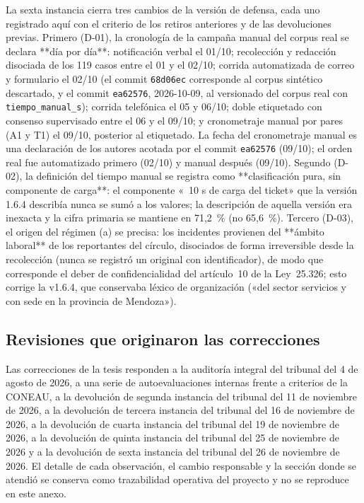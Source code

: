 La sexta instancia cierra tres cambios de la versión de defensa, cada uno registrado aquí con el criterio de los retiros anteriores y de las devoluciones previas. Primero (D-01), la cronología de la campaña manual del corpus real se declara **día por día**: notificación verbal el 01/10; recolección y redacción disociada de los 119 casos entre el 01 y el 02/10; corrida automatizada de correo y formulario el 02/10 (el commit \texttt{68d06ec} corresponde al corpus sintético descartado, y el commit \texttt{ea62576}, 2026-10-09, al versionado del corpus real con \texttt{tiempo\_manual\_s}); corrida telefónica el 05 y 06/10; doble etiquetado con consenso supervisado entre el 06 y el 09/10; y cronometraje manual por pares (A1 y T1) el 09/10, posterior al etiquetado. La fecha del cronometraje manual es una declaración de los autores acotada por el commit \texttt{ea62576} (09/10); el orden real fue automatizado primero (02/10) y manual después (09/10). Segundo (D-02), la definición del tiempo manual se registra como **clasificación pura, sin componente de carga**: el componente «~10 s de carga del ticket» que la versión 1.6.4 describía nunca se sumó a los valores; la descripción de aquella versión era inexacta y la cifra primaria se mantiene en 71,2~\% (no 65,6~\%). Tercero (D-03), el origen del régimen (a) se precisa: los incidentes provienen del **ámbito laboral** de los reportantes del círculo, disociados de forma irreversible desde la recolección (nunca se registró un original con identificador), de modo que corresponde el deber de confidencialidad del artículo~10 de la Ley~25.326; esto corrige la v1.6.4, que conservaba léxico de organización («del sector servicios y con sede en la provincia de Mendoza»).

\subsection{Revisiones que originaron las correcciones}

Las correcciones de la tesis responden a la auditoría integral del tribunal del 4 de agosto de 2026, a una serie de autoevaluaciones internas frente a criterios de la CONEAU, a la devolución de segunda instancia del tribunal del 11 de noviembre de 2026, a la devolución de tercera instancia del tribunal del 16 de noviembre de 2026, a la devolución de cuarta instancia del tribunal del 19 de noviembre de 2026, a la devolución de quinta instancia del tribunal del 25 de noviembre de 2026 y a la devolución de sexta instancia del tribunal del 26 de noviembre de 2026. El detalle de cada observación, el cambio responsable y la sección donde se atendió se conserva como trazabilidad operativa del proyecto y no se reproduce en este anexo.

